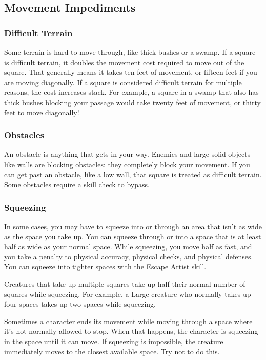     \subsection{Movement Impediments}

        \subsubsection{Difficult Terrain}
            Some terrain is hard to move through, like thick bushes or a swamp. If a square is difficult terrain, it doubles the movement cost required to move out of the square. That generally means it takes ten feet of movement, or fifteen feet if you are moving diagonally. If a square is considered difficult terrain for multiple reasons, the cost increases stack. For example, a square in a swamp that also has thick bushes blocking your passage would take twenty feet of movement, or thirty feet to move diagonally!

        \subsubsection{Obstacles}
            An obstacle is anything that gets in your way. Enemies and large solid objects like walls are blocking obstacles: they completely block your movement. If you can get past an obstacle, like a low wall, that square is treated as difficult terrain. Some obstacles require a skill check to bypass.

        \subsubsection{Squeezing}\label{Squeezing}

            In some cases, you may have to squeeze into or through an area that isn't as wide as the space you take up. You can squeeze through or into a space that is at least half as wide as your normal space. While squeezing, you move half as fast, and you take a  penalty to physical accuracy, physical checks, and physical defenses. You can squeeze into tighter spaces with the Escape Artist skill.

            Creatures that take up multiple squares take up half their normal number of squares while squeezing. For example, a Large creature who normally takes up four spaces takes up two spaces while squeezing.

             Sometimes a character ends its movement while moving through a space where it's not normally allowed to stop. When that happens, the character is squeezing in the space until it can move. If squeezing is impossible, the creature immediately moves to the closest available space. Try not to do this.

